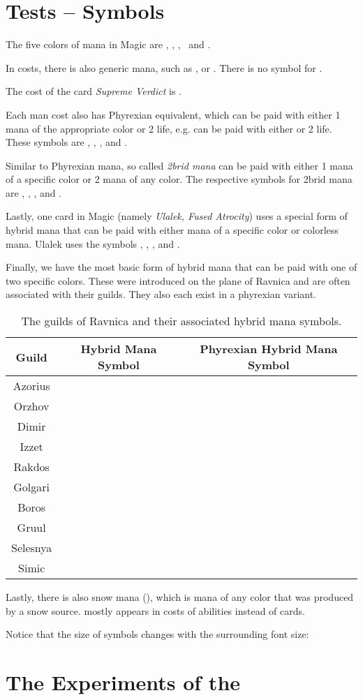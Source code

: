 \documentclass[a4paper]{scrartcl}
\begin{document}
	\section*{Tests -- Symbols}
	The five colors of mana in Magic are \mtgwhite, \mtgblue, \mtgblack, \mtgred\ and \mtggreen .

	In costs, there is also generic mana, such as ,  or .
	There is no symbol for .

	The cost of the card \emph{Supreme Verdict} is \mtgwhite\mtgblue .

	Each man cost also has Phyrexian equivalent, which can be paid with either 1 mana of the appropriate color or 2 life, e.g. \mtgUP{} can be paid with either \mtgU{} or 2 life.
	These symbols are \mtgWP, \mtgUP, \mtgBP, \mtgRP{} and \mtgGP.

	Similar to Phyrexian mana, so called \emph{2brid mana} can be paid with either 1 mana of a specific color or 2 mana of any color.
	The respective symbols for 2brid mana are \mtgTwoW, \mtgTwoU, \mtgTwoB, \mtgTwoR{} and \mtgTwoG.

	Lastly, one card in Magic (namely \emph{Ulalek, Fused Atrocity}) uses a special form of hybrid mana that can be paid with either mana of a specific color or colorless mana.
	Ulalek uses the symbols \mtgCW, \mtgCU, \mtgCB, \mtgCR{} and \mtgCG.

	Finally, we have the most basic form of hybrid mana that can be paid with one of two specific colors.
	These were introduced on the plane of Ravnica and are often associated with their guilds.
	They also each exist in a phyrexian variant.
	\begin{table}[h]
		\begin{tabular}{c c c}
			\textbf{Guild} & \textbf{Hybrid Mana Symbol} & \textbf{Phyrexian Hybrid Mana Symbol}\\\hline
			Azorius  & \mtgWU & \mtgWUP \\
			Orzhov   & \mtgWB & \mtgWBP \\
			Dimir    & \mtgUB & \mtgUBP \\
			Izzet    & \mtgUR & \mtgURP \\
			Rakdos   & \mtgBR & \mtgBRP \\
			Golgari  & \mtgBG & \mtgBGP \\
			Boros    & \mtgRW & \mtgRWP \\
			Gruul    & \mtgRG & \mtgRGP \\
			Selesnya & \mtgGW & \mtgGWP \\
			Simic    & \mtgGU & \mtgGUP 
		\end{tabular}
		\caption{The guilds of Ravnica and their associated hybrid mana symbols.}
	\end{table}

	Lastly, there is also snow mana (\mtgS), which is mana of any color that was produced by a snow source.
	\mtgSnow{} mostly appears in costs of abilities instead of cards.

	Notice that the size of symbols changes with the surrounding font size:
	\section{The Experiments of the \mtgUR}
\end{document}
